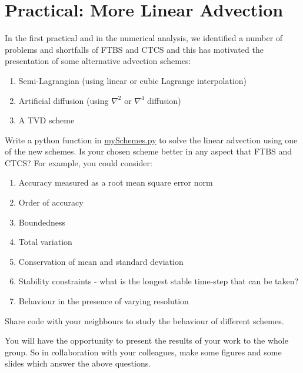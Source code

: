 %
\clearpage{}


\section{Practical: More Linear Advection}

In the first practical and in the numerical analysis, we identified
a number of problems and shortfalls of FTBS and CTCS and this has
motivated the presentation of some alternative advection schemes:
\begin{enumerate}
\item Semi-Lagrangian (using linear or cubic Lagrange interpolation)
\item Artificial diffusion (using $\nabla^{2}$ or $\nabla^{4}$ diffusion) 
\item A TVD scheme
\end{enumerate}
Write a python function in \url{mySchemes.py} to solve the linear
advection using one of the new schemes. Is your chosen scheme better
in any aspect that FTBS and CTCS? For example, you could consider:
\begin{enumerate}
\item Accuracy measured as a root mean square error norm
\item Order of accuracy
\item Boundedness
\item Total variation
\item Conservation of mean and standard deviation
\item Stability constraints - what is the longest stable time-step that
can be taken?
\item Behaviour in the presence of varying resolution
\end{enumerate}
Share code with your neighbours to study the behaviour of different
schemes. 

You will have the opportunity to present the results of your work
to the whole group. So in collaboration with your colleagues, make
some figures and some slides which answer the above questions.%

